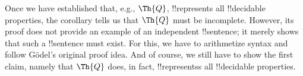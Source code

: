 \documentclass[../../../include/open-logic-section]{subfiles}
\begin{document}
Once we have established that, e.g., $\Th{Q}$, !!{represents} all
!!{decidable} properties, the corollary tells us that $\Th{Q}$ must be
incomplete. However, its proof does not provide an example of an
independent !!{sentence}; it merely shows that such a !!{sentence}
must exist. For this, we have to arithmetize syntax and follow
G\"odel's original proof idea.  And of course, we still have to show
the first claim, namely that $\Th{Q}$ does, in fact, !!{represents}s
all !!{decidable} properties.
\end{document}
